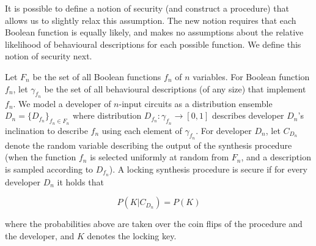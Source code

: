 \begin{definition}
It is possible to define a notion of security (and construct a procedure) that allows us to slightly relax this assumption. The new notion requires that each Boolean function is equally likely, and makes no assumptions about the relative likelihood of behavioural descriptions for each possible function. We define this notion of security next.

\end{definition}



\begin{definition} Let $F_n$ be the set of all Boolean functions $f_n$ of $n$ variables. For Boolean function $f_n$, let $\gamma_{f_n}$ be the set of all behavioural descriptions (of any size) that implement $f_n$. We model a developer of $n$-input circuits as a distribution ensemble $D_n=\{D_{f_n}\}_{f_n\in F_n}$ where distribution $D_{f_n}:\gamma_{f_n}\rightarrow [0,1]$ describes developer $D_n$'s inclination to describe $f_n$ using each element of $\gamma_{f_n}$. For developer $D_n$, let $C_{D_n}$ denote the random variable describing the output of the synthesis procedure (when the function $f_n$ is selected uniformly at random from $F_n$, and a description is sampled according to $D_{f_n}$). A locking synthesis procedure is secure if for every developer $D_n$ it holds that

$$ P(K|C_{D_n})=P(K) $$

where the probabilities above are taken over the coin flips of the procedure and the developer, and $K$ denotes the locking key.
\end{definition}

